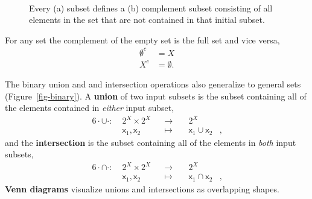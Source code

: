 \documentclass[
  letterpaper,
  DIV=11,
  numbers=noendperiod]{scrartcl}
\begin{document}
\begin{figure}
\begin{minipage}[t]{0.45\linewidth}
{{}

}

\subcaption{\label{fig-complement}}
\end{minipage}%
%
\begin{minipage}[t]{0.05\linewidth}

{\centering 

~

}

\end{minipage}%

\caption{\label{fig-unary}Every (a) subset defines a (b) complement
subset consisting of all elements in the set that are not contained in
that initial subset.}

\end{figure}

For any set the complement of the empty set is the full set and vice
versa, \begin{align*}
\emptyset^{c} &= X
\\
X^{c} &= \emptyset.
\end{align*}

The binary union and and intersection operations also generalize to
general sets (Figure~\ref{fig-binary}). A \textbf{union} of two input
subsets is the subset containing all of the elements contained in
\emph{either} input subset, \begin{alignat*}{6}
\cdot \cup \cdot :\; & 2^{X} \times 2^{X}& &\rightarrow& \; & 2^{X} &
\\
& \mathsf{x}_1, \mathsf{x}_{2} & &\mapsto& & \mathsf{x}_1 \cup \mathsf{x}_2 &,
\end{alignat*} and the \textbf{intersection} is the subset containing
all of the elements in \emph{both} input subsets, \begin{alignat*}{6}
\cdot \cap \cdot :\; & 2^{X} \times 2^{X}& &\rightarrow& \; & 2^{X} &
\\
& \mathsf{x}_1, \mathsf{x}_{2} & &\mapsto& & \mathsf{x}_1 \cap \mathsf{x}_2 &,
\end{alignat*} \textbf{Venn diagrams} visualize unions and intersections
as overlapping shapes.
\end{document}

